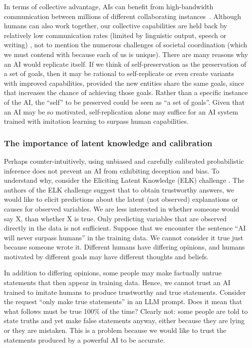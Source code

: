 In terms of collective advantage, AIs can benefit from high-bandwidth communication between millions of different collaborating instances~\cite{darioamodei.com.machines.of.loving.grace}. Although humans can also work together, our collective capabilities are held back by relatively low communication rates (limited by linguistic output, speech or writing) \cite{www.science.org.doi.10.1126.sciadv.aaw2594}, not to mention the numerous challenges of societal coordination (which we must contend with because each of us is unique).
There are many reasons why an AI would replicate itself. If we think of self-preservation as the preservation of a set of goals, then it may be rational to self-replicate or even create variants with improved capabilities, provided the new entities share the same goals, since that increases the chance of achieving those goals. Rather than a specific instance of the AI, the ``self'' to be preserved could be seen as ``a set of goals''.
Given that an AI may be so motivated, self-replication alone may suffice for an AI system trained with imitation learning to surpass human capabilities.

    \subsubsection{The importance of latent knowledge and calibration}
    \label{sec:existential:misagencyimitation:elkchallenge}

Perhaps counter-intuitively, using unbiased and carefully calibrated probabilistic inference does not prevent an AI from exhibiting deception and bias.
To understand why, consider the Eliciting Latent Knowledge (ELK) challenge \cite{docs.google.com.document.d.1WwsnJQstPq91.Yh.Ch2XRL8H.EpsnjrC1dwZXR37PC8.edit.tab.t.0heading.h.kkaua0hwmp1d}.  
The authors of the ELK challenge suggest that to obtain trustworthy answers, we would like to elicit predictions about the latent (not observed) explanations or causes for observed variables. We are less interested in whether someone would say X, than whether X is true. 
Only predicting variables that are observed directly in the data is not sufficient. 
Suppose that we encounter the sentence ``AI will never surpass humans'' in the training data. We cannot consider it true just because someone wrote it. Different humans have differing opinions, and humans motivated by different goals may have different thoughts and beliefs.

In addition to differing opinions, some people may make factually untrue statements that then appear in training data. Hence, we cannot trust an AI trained to imitate humans to produce trustworthy and true statements. Consider the request ``only make true statements'' in an LLM prompt. Does it mean that what follows must be true 100\% of the time? Clearly not: some people are told to state truths and yet make false statements anyway, either because they are lying or they are mistaken. This is a problem because we would like to trust the statements produced by a powerful AI to be accurate.

